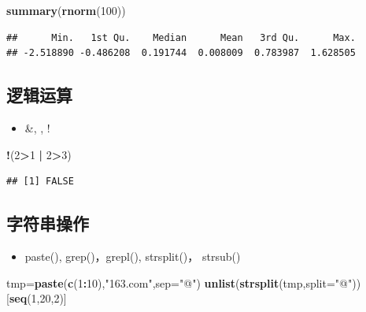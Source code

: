 \documentclass[]{book}
\newenvironment{Shaded}{\begin{snugshade}}{\end{snugshade}}
\newcommand{\DataTypeTok}[1]{\textcolor[rgb]{0.13,0.29,0.53}{#1}}
\newcommand{\DecValTok}[1]{\textcolor[rgb]{0.00,0.00,0.81}{#1}}
\newcommand{\KeywordTok}[1]{\textcolor[rgb]{0.13,0.29,0.53}{\textbf{#1}}}
\newcommand{\NormalTok}[1]{#1}
\newcommand{\OperatorTok}[1]{\textcolor[rgb]{0.81,0.36,0.00}{\textbf{#1}}}
\newcommand{\StringTok}[1]{\textcolor[rgb]{0.31,0.60,0.02}{#1}}
\providecommand{\tightlist}{%
  \setlength{\itemsep}{0pt}\setlength{\parskip}{0pt}}
\begin{document}
\begin{Shaded}
\begin{Highlighting}[]
\KeywordTok{summary}\NormalTok{(}\KeywordTok{rnorm}\NormalTok{(}\DecValTok{100}\NormalTok{))}
\end{Highlighting}
\end{Shaded}

\begin{verbatim}
##      Min.   1st Qu.    Median      Mean   3rd Qu.      Max. 
## -2.518890 -0.486208  0.191744  0.008009  0.783987  1.628505
\end{verbatim}

\hypertarget{section-11}{%
\subsection{逻辑运算}\label{section-11}}

\begin{itemize}
\tightlist
\item
  \&, \textbar{}, !
\end{itemize}

\begin{Shaded}
\begin{Highlighting}[]
\OperatorTok{!}\NormalTok{(}\DecValTok{2}\OperatorTok{>}\DecValTok{1} \OperatorTok{|}\StringTok{ }\DecValTok{2}\OperatorTok{>}\DecValTok{3}\NormalTok{)}
\end{Highlighting}
\end{Shaded}

\begin{verbatim}
## [1] FALSE
\end{verbatim}

\hypertarget{section-12}{%
\subsection{字符串操作}\label{section-12}}

\begin{itemize}
\tightlist
\item
  paste(), grep()，grepl(), strsplit()， strsub()
\end{itemize}

\begin{Shaded}
\begin{Highlighting}[]
\NormalTok{tmp=}\KeywordTok{paste}\NormalTok{(}\KeywordTok{c}\NormalTok{(}\DecValTok{1}\OperatorTok{:}\DecValTok{10}\NormalTok{),}\StringTok{"163.com"}\NormalTok{,}\DataTypeTok{sep=}\StringTok{"@"}\NormalTok{)}
\KeywordTok{unlist}\NormalTok{(}\KeywordTok{strsplit}\NormalTok{(tmp,}\DataTypeTok{split=}\StringTok{"@"}\NormalTok{))[}\KeywordTok{seq}\NormalTok{(}\DecValTok{1}\NormalTok{,}\DecValTok{20}\NormalTok{,}\DecValTok{2}\NormalTok{)]}
\end{Highlighting}
\end{Shaded}
\end{document}
